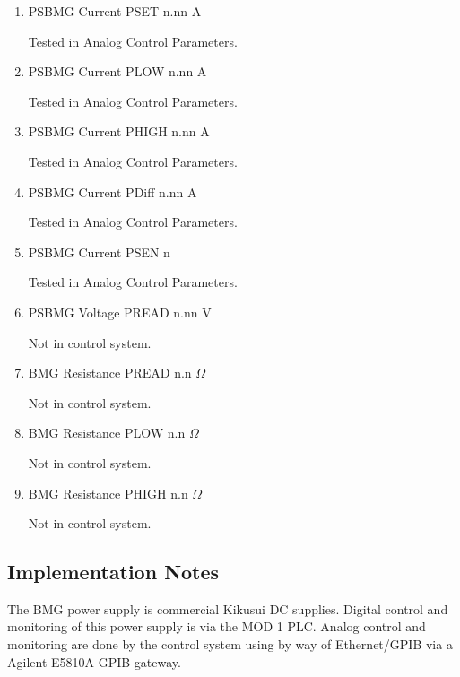 \documentclass[11pt]{book}		%
\begin{document}
\begin{enumerate}
 \item PSBMG Current PSET  n.nn A

\color{red}
Tested in Analog Control Parameters.
\color{black}

 \item PSBMG Current PLOW  n.nn A

\color{red}
Tested in Analog Control Parameters.
\color{black}

 \item PSBMG Current PHIGH n.nn A

\color{red}
Tested in Analog Control Parameters.
\color{black}

 \item PSBMG Current PDiff n.nn A

\color{red}
Tested in Analog Control Parameters.
\color{black}

 \item PSBMG Current PSEN  n

\color{red}
Tested in Analog Control Parameters.
\color{black}

 \item PSBMG Voltage PREAD n.nn V

\color{red}
Not in control system.
\color{black}

 \item BMG Resistance PREAD n.n $\Omega$

\color{red}
Not in control system.
\color{black}

 \item BMG Resistance PLOW n.n $\Omega$

\color{red}
Not in control system.
\color{black}

 \item BMG Resistance PHIGH n.n $\Omega$

\color{red}
Not in control system.
\color{black}

\end{enumerate}

\subsection{Implementation Notes}

The BMG power supply is commercial Kikusui DC supplies.  Digital control and monitoring of this power supply is via the MOD 1 PLC.  Analog control and monitoring are done by the control system using by way of Ethernet/GPIB via a Agilent E5810A GPIB gateway.
\end{document}
